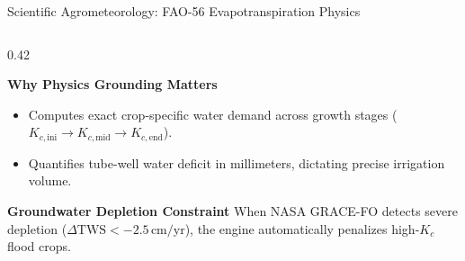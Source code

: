 \documentclass[aspectratio=169,10pt]{beamer}
\begin{document}
\begin{frame}{Scientific Agrometeorology: FAO-56 Evapotranspiration Physics}
\begin{columns}[T]
\begin{column}{0.42\textwidth}
\begin{exampleblock}{\textbf{Why Physics Grounding Matters}}
\begin{itemize}
                    \item Computes exact crop-specific water demand across growth stages ($K_{c,\text{ini}} \rightarrow K_{c,\text{mid}} \rightarrow K_{c,\text{end}}$).
                    \item Quantifies tube-well water deficit in millimeters, dictating precise irrigation volume.
                \end{itemize}
            \end{exampleblock}
            \vspace{0.2cm}
            \begin{alertblock}{\textbf{Groundwater Depletion Constraint}}
                \scriptsize
                When NASA GRACE-FO detects severe depletion ($\Delta\text{TWS} < -2.5\,\text{cm/yr}$), the engine automatically penalizes high-$K_c$ flood crops.
            \end{alertblock}
        \end{column}
    \end{columns}
\end{frame}
\end{document}
